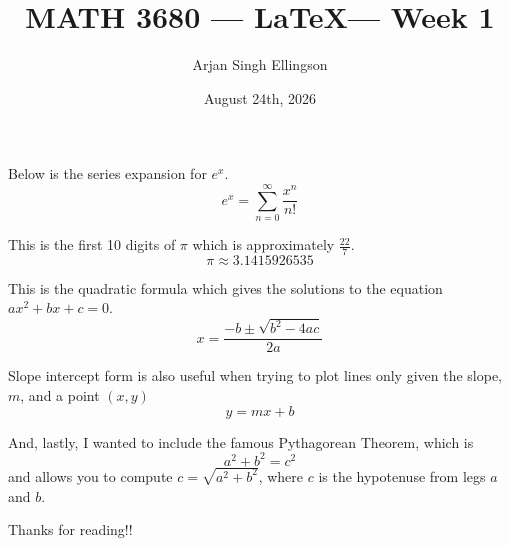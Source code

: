 \documentclass{article}
\title{MATH 3680 — \LaTeX — Week 1 }
\author{Arjan Singh Ellingson}
\date{August 24th, 2026}
\begin{document}
\maketitle 


Below is the series expansion for $e^x$.
$$e^x = \sum_{n=0}^{\infty} \frac{x^n}{n!}$$

This is the first 10 digits of $\pi$ which is approximately $\frac{22}{7}$.
$$\pi \approx 3.1415926535$$

This is the quadratic formula which gives the solutions to the equation $ax^2 + bx + c = 0$.
$$x = \frac{-b \pm \sqrt{b^2 - 4ac}}{2a}$$

Slope intercept form is also useful when trying to plot lines only given the slope, $m$, and a point $(x,y)$
$$y=mx+b$$

And, lastly, I wanted to include the famous Pythagorean Theorem, which is
$$a^2 + b^2 = c^2$$
and allows you to compute $c = \sqrt{a^2 + b^2}$, where $c$ is the hypotenuse from legs $a$ and $b$.

Thanks for reading!!
\end{document}
